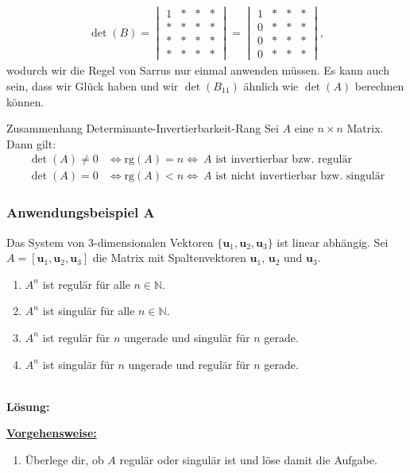 \begin{itemize}
\begin{align*}
\det(B) 
=
\begin{vmatrix}
1 & \ast  & \ast & \ast\\
\ast &\ast &  \ast  & \ast\\
\ast &\ast &  \ast  & \ast\\
\ast &\ast &  \ast  & \ast
\end{vmatrix}
= \begin{vmatrix}
1 & \ast  & \ast & \ast\\
0&\ast &  \ast  & \ast\\
0 &\ast &  \ast  & \ast\\
0 &\ast &  \ast  & \ast
\end{vmatrix},
\end{align*}
wodurch wir die Regel von Sarrus nur einmal anwenden müssen.
Es kann auch sein, dass wir Glück haben und wir $\det(B_{11})$ ähnlich wie $\det(A)$ berechnen können.
\end{itemize}

\begin{mybox}{Zusammenhang Determinante-Invertierbarkeit-Rang}
Sei $A$ eine $n\times n$ Matrix.
Dann gilt:
\begin{align*}
\det(A) \neq 0 
&\Leftrightarrow
\mathrm{rg}(A) = n
\Leftrightarrow
\ \text{$A$ ist invertierbar bzw. regulär}\\
\det(A) = 0 
&\Leftrightarrow
\mathrm{rg}(A) < n
\Leftrightarrow
\ \text{$A$ ist nicht invertierbar bzw. singulär}
\end{align*}
\end{mybox}
\newpage
\subsubsection*{Anwendungsbeispiel A}

Das System von $3$-dimensionalen Vektoren
$\lbrace \textbf{u}_1, \textbf{u}_2, \textbf{u}_3 \rbrace$
ist linear abhängig.
Sei $A = [\textbf{u}_1, \textbf{u}_2, \textbf{u}_3]$ die Matrix mit Spaltenvektoren $\textbf{u}_1$, $\textbf{u}_2$ und $\textbf{u}_3$. 
\renewcommand{\labelenumi}{(\alph{enumi})}
\begin{enumerate}
\item 
$A^n$ ist regulär für alle $n \in \mathbb{N}$.
\item
$A^n$ ist singulär für alle $n \in \mathbb{N}$.
\item
$A^n$ ist regulär für $n$ ungerade und singulär für $n$ gerade.
\item
$A^n$ ist singulär für $n$ ungerade und regulär für $n$ gerade.
\end{enumerate}
\ \\
\textbf{Lösung:}
\begin{mdframed}
\underline{\textbf{Vorgehensweise:}}
\renewcommand{\labelenumi}{\theenumi.}
\begin{enumerate}
\item Überlege dir, ob $A$ regulär oder singulär ist und löse damit die Aufgabe.
\end{enumerate}
\end{mdframed}

